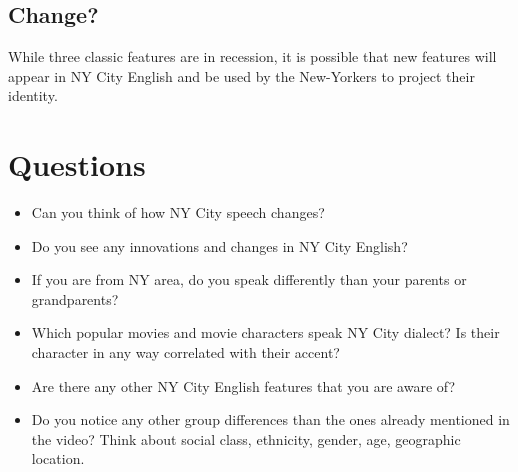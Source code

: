 \documentclass[11pt]{article}
\newcommand{\1}{$'$}
\newcommand{\2}{$''$}
\newcommand{\3}{$'''$}
\begin{document}
\subsection{Change?}

While three classic features are in recession, it is possible that new features will appear in NY City English and be used by the New-Yorkers to project their identity.

\section{Questions}

\begin{itemize}
\item Can you think of how NY City speech changes? 
\item Do you see any innovations and changes in NY City English? 
\item If you are from NY area, do you speak differently than your parents or grandparents?
\item Which popular movies and movie characters speak NY City dialect? Is their character in any way correlated with their accent?
\item Are there any other NY City English features that you are aware of?
\item Do you notice any other group differences than the ones already mentioned in the video? Think about social class, ethnicity, gender, age, geographic location.
\end{itemize}




\end{document}
